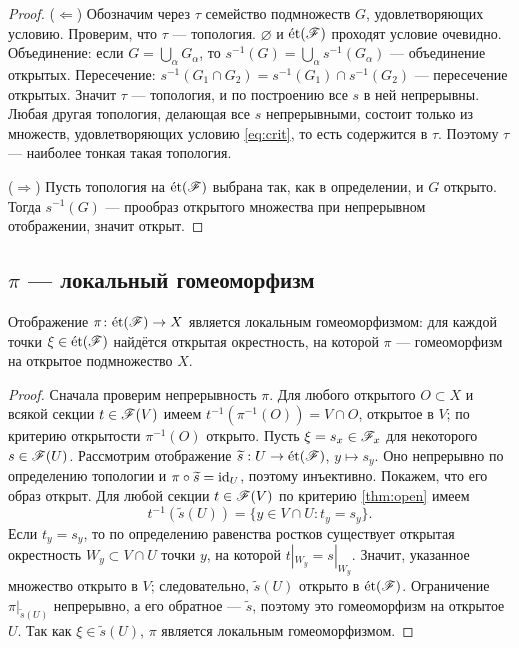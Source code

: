 \begin{proof}
($\Leftarrow$) Обозначим через $\tau$ семейство подмножеств $G$,
удовлетворяющих условию. Проверим, что $\tau$ --- топология.
$\varnothing$ и $\et(\Shv{F})$ проходят условие очевидно. Объединение:
если $G=\bigcup_\alpha G_\alpha$, то
$s^{-1}(G)=\bigcup_\alpha s^{-1}(G_\alpha)$ --- объединение открытых.
Пересечение: $s^{-1}(G_1\cap G_2)=s^{-1}(G_1)\cap s^{-1}(G_2)$ ---
пересечение открытых. Значит $\tau$ --- топология, и по построению
все $s$ в ней непрерывны. Любая другая топология, делающая все $s$
непрерывными, состоит только из множеств, удовлетворяющих условию
\eqref{eq:crit}, то есть содержится в $\tau$. Поэтому $\tau$ --- наиболее
тонкая такая топология.

($\Rightarrow$) Пусть топология на $\et(\Shv{F})$ выбрана так, как в
определении, и $G$ открыто. Тогда $s^{-1}(G)$ --- прообраз открытого
множества при непрерывном отображении, значит открыт.
\end{proof}


\subsection{\texorpdfstring{$\pi$}{} --- локальный гомеоморфизм}
\leavevmode\par
\begin{thm}\label{thm:localhomeo}
Отображение $\pi\colon\et(\Shv{F})\to X$ является локальным
гомеоморфизмом: для каждой точки $\xi\in\et(\Shv{F})$ найдётся открытая
окрестность, на которой $\pi$ --- гомеоморфизм на открытое подмножество
$X$.
\end{thm}

\begin{proof}
Сначала проверим непрерывность $\pi$. Для любого открытого $O\subset X$
и всякой секции $t\in\Shv{F}(V)$ имеем
$t^{-1}(\pi^{-1}(O))=V\cap O$, открытое в $V$; по критерию
открытости $\pi^{-1}(O)$ открыто.
Пусть $\xi=s_x\in\Shv{F}_x$ для некоторого $s\in\Shv{F}(U)$.
Рассмотрим отображение $\widetilde s:U\to\et(\Shv{F})$,
$y\mapsto s_y$. Оно непрерывно по определению топологии и
$\pi\circ\widetilde s=\id_U$, поэтому инъективно. Покажем, что его
образ открыт. Для любой секции $t\in\Shv{F}(V)$ по критерию
\ref{thm:open} имеем
\[
 t^{-1}(\widetilde s(U))=\{y\in V\cap U:t_y=s_y\}.
\]
Если $t_y=s_y$, то по определению равенства ростков существует открытая
окрестность $W_y\subset V\cap U$ точки $y$, на которой
$t|_{W_y}=s|_{W_y}$. Значит, указанное множество открыто в $V$;
следовательно, $\widetilde s(U)$ открыто в $\et(\Shv{F})$.
Ограничение $\pi|_{\widetilde s(U)}$ непрерывно, а его обратное ---
$\widetilde s$, поэтому это гомеоморфизм на открытое $U$. Так как
$\xi\in\widetilde s(U)$, $\pi$ является локальным гомеоморфизмом.
\end{proof}

